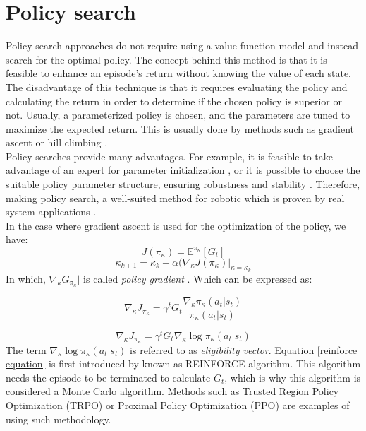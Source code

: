 \section{Policy search}

Policy search approaches do not require using a value function model and instead search for the optimal policy. The concept behind this method is that it is feasible to enhance an episode's return without knowing the value of each state. The disadvantage of this technique is that it requires evaluating the policy and calculating the return in order to determine if the chosen policy is superior or not. Usually, a parameterized policy is chosen, and the parameters are tuned to maximize the expected return. This is usually done by methods such as gradient ascent \cite{baird1999reinforcement} or hill climbing \cite{kimura1995reinforcement}. \\

Policy searches provide many advantages. For example, it is feasible to take advantage of an expert for parameter initialization \cite{peters2006policy}, or it is possible to choose the suitable policy parameter structure, ensuring robustness and stability \cite{bertsekas2011dynamic}. Therefore, making policy search, a well-suited method for robotic which is proven by real system applications \cite{deisenroth2014multi, vikas2015model}.\\

In the case where gradient ascent is used for the optimization of the policy, we have: 
\begin{equation}
	J(\pi_{\kappa}) = \mathbb{E}^{\pi_{\kappa}}[G_{t}]
\end{equation}
\begin{equation}
	\kappa_{k+1}=\kappa_k+\alpha (\nabla_{\kappa} J(\pi_{\kappa})|_{\kappa=\kappa_k}
\end{equation}
In which, $\nabla_{\kappa} G_{\pi_{\kappa}}|$ is called \textit{policy gradient} \cite{sutton1999policy}. Which can be expressed as:

\begin{equation}
	\nabla_{\kappa} J_{\pi_{\kappa}} = \gamma^t G_{t}  \frac{\nabla_{\kappa} \pi_{\kappa}(a_t|s_t)}{\pi_{\kappa}(a_t|s_t)}
\end{equation}

\begin{equation}
	\nabla_{\kappa} J_{\pi_{\kappa}} = \gamma^t G_{t} \nabla_{\kappa}   \log \pi_{\kappa}(a_t|s_t) 
	\label{reinforce equation}
\end{equation}
The term $\nabla_{\kappa}   \log \pi_{\kappa}(a_t|s_t)$ is referred to as \textit{eligibility vector}.
Equation \ref{reinforce equation} is first introduced by \cite{williams1992simple} known as REINFORCE algorithm. This algorithm needs the episode to be terminated to calculate $G_t$, which is why this algorithm is considered a Monte Carlo algorithm. Methods such as Trusted Region Policy Optimization (TRPO) \cite{schulman2015trust} or Proximal Policy Optimization (PPO) \cite{schulman2017proximal} are examples of using such methodology.\\

